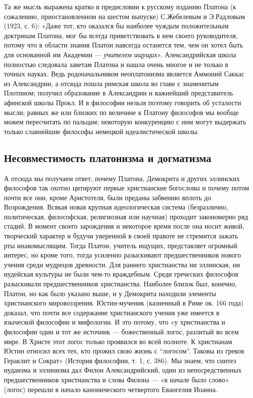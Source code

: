 Та же мысль  выражена кратко в предисловии к  русскому изданию Платона
(к  сожалению,  приостановленном  на  шестом  выпуске)  С.Жебелевым  и
Э.Радловым (1923,  с. 6): «Даже  тот, кто оказался бы  наиболее чуждым
положительным доктринам  Платона, мог  бы всегда приветствовать  в нем
своего  руководителя,  потому что  в  области  знания Платон  навсегда
останется  тем, чем  он  хотел  быть для  основанной  им Академии  ---
\emph{учителем  ищущих}».  Александрийская школа  полностью  следовала
заветам Платона и нашла очень многое и не только в точных науках. Ведь
родоначальником неоплатонизма является  Аммоний Саккас из Александрии,
а отсюда пошла  римская школа во главе с  знаменитым Плотином; получил
образование  в Александрии  и важнейший  представитель афинской  школы
Прокл.  И в  философии  нельзя поэтому  говорить  об усталости  мысли;
равных же или близких по величине  к Платону философов мы вообще можем
пересчитать по  пальцам; некоторую  конкуренцию с ним  могут выдержать
только славнейшие философы немецкой идеалистической школы.

\subsection{Несовместимость платонизма и догматизма}

А  отсюда  мы  получаем  ответ, почему  Платона,  Демокрита  и  других
эллинских философов так охотно  цитируют первые христианские богословы
и почему потом почти все  они, кроме Аристотеля, были преданы забвению
вплоть  до Возрождения.  Всякая новая  крупная идеологическая  система
(безразлично,  политическая,  философская,  религиозная  или  научная)
проходит  закономерно  ряд  стадий.   В  момент  своего  зарождения  и
некоторое время  после она носит  живой, творческий характер  и будучи
уверенной  в  своей правоте  не  стремится  зажать рты  инакомыслящим.
Тогда  Платон,  учитель  ищущих,  представляет  огромный  интерес,  но
кроме того, тогда усиленно  разыскивают предшественников нового учения
среди  мудрецов  древности.  Для раннего  христианства  ни  эллинская,
ни  иудейская  культуры не  были  чем-то  враждебным. Среди  греческих
философов разыскивали  предшественников христианства.  Наиболее близок
был, конечно, Платон, но как было указано выше, и у Демокрита находили
элементы христианского мировоззрения.  Юстин-мученик (казненный в Риме
ок. 166 года)  доказал, что почти все  содержание христианского учения
уже имеется  в языческой философии и  мифологии. И это потому,  что «у
христианства  и философии  один  и тот  же  источник ---  божественный
логос, разлитый во всем мире. В  Христе этот логос только проявился во
всей полноте.  К христианам  Юстин относил всех  тех, кто  прожил свою
жизнь  с ``логосом''.  Таковы из  греков Гераклит  и Сократ»  (История
философии, т.  1, с. 386). Мы  знаем, что синтез иудаизма  и эллинизма
дал Филон  Александрийский, один из  непосредственных предшественников
христианства и слова Филона ---  «в начале было слово» (логос) перешли
в начало канонического четвертого Евангелия Иоанна.

